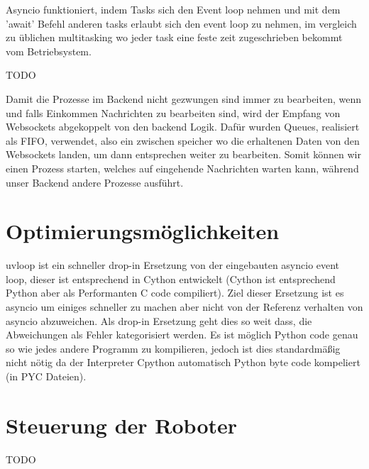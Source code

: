 Asyncio funktioniert, indem Tasks sich den Event loop nehmen und mit dem 'await' 
Befehl anderen tasks erlaubt sich den event loop zu nehmen, im vergleich zu üblichen multitasking
wo jeder task eine feste zeit zugeschrieben bekommt vom Betriebsystem.

TODO

Damit die Prozesse im Backend nicht gezwungen sind immer zu bearbeiten, 
wenn und falls Einkommen Nachrichten zu bearbeiten sind, 
wird der Empfang von Websockets abgekoppelt von den backend Logik.
Dafür wurden Queues, realisiert als FIFO, verwendet, also ein zwischen speicher 
wo die erhaltenen Daten von den Websockets landen, um dann entsprechen weiter zu bearbeiten.
Somit können wir einen Prozess starten, welches auf eingehende Nachrichten warten kann, 
während unser Backend andere Prozesse ausführt.

\section{Optimierungsmöglichkeiten}
\label{subsec:Optimierungsmöglichkeiten}
uvloop ist ein schneller drop-in Ersetzung von der eingebauten asyncio event loop, 
dieser ist entsprechend in Cython entwickelt (Cython ist entsprechend Python aber als Performanten C code compiliert).
Ziel dieser Ersetzung ist es asyncio um einiges schneller zu machen aber nicht von der Referenz verhalten von asyncio abzuweichen. 
Als drop-in Ersetzung geht dies so weit dass, die Abweichungen als Fehler kategorisiert werden.
Es ist möglich Python code genau so wie jedes andere Programm zu kompilieren,
jedoch ist dies standardmäßig nicht nötig da der Interpreter Cpython automatisch Python byte code kompeliert (in PYC Dateien).


\section{Steuerung der Roboter}
\label{subsec:backend_robot_detection}
TODO 
